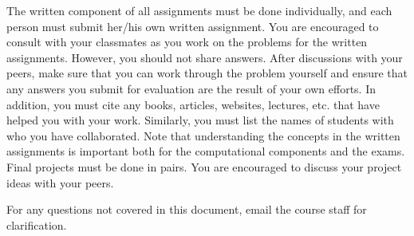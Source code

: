 \documentclass[11pt]{article}
\begin{document}
The written component of all assignments must be done individually, and each person must submit her/his own written assignment. You are encouraged to consult with your classmates as you work on the problems for the written assignments. However, you should not share answers.  After discussions with your peers, make sure that you can work through the problem yourself and ensure that any answers you submit for evaluation are the result of your own efforts. In addition, you must cite any books, articles, websites, lectures, etc. that have helped you with your work. Similarly, you must list the names of students with who you have collaborated.  Note that understanding the concepts in the written assignments is important both for the computational components and the exams. Final projects must be done in pairs. You are encouraged to discuss your project ideas with your peers.

For any questions not covered in this document, email the course staff for clarification.
\end{document}
